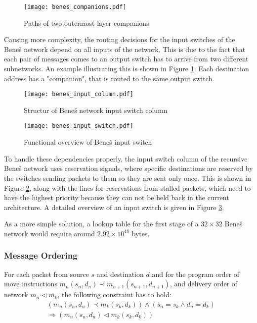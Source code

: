 \begin{figure}[!ht]
	\centering
	\texttt{[image: benes\_companions.pdf]}
	\caption{Paths of two outermost-layer companions}
	\label{fig:benes_companions}
\end{figure}

Causing more complexity, the routing decisions for the input switches of the Beneš network depend on all inputs of the network.
This is due to the fact that each pair of messages comes to an output switch has to arrive from two different subnetworks.
An example illustrating this is shown in Figure \ref{fig:benes_companions}.
Each destination address has a "companion", that is routed to the same output switch.

\begin{figure}[!ht]
	\centering
	\texttt{[image: benes\_input\_column.pdf]}
	\caption{Structur of Beneš network input switch column}
	\label{fig:benes_switchcolumn_in}
\end{figure}

\begin{figure}[!ht]
	\centering
	\texttt{[image: benes\_input\_switch.pdf]}
	\caption{Functional overview of Beneš input switch}
	\label{fig:benes_switch_in}
\end{figure}

To handle these dependencies properly, the input switch column of the recursive Beneš network uses reservation signals, where specific destinations are reserved by the switches sending packets to them so they are sent only once.
This is shown in Figure \ref{fig:benes_switchcolumn_in}, along with the lines for reservations from stalled packets, which need to have the highest priority because they can not be held back in the current architecture.
A detailed overview of an input switch is given in Figure \ref{fig:benes_switch_in}.

As a more simple solution, a lookup table for the first stage of a $32\times32$ Beneš network would require around $2.92\times10^{48}$ bytes.


\FloatBarrier
\subsubsection{Message Ordering}

		For each packet from source $s$ and destination $d$ and for the program order of move instructions $m_n(s_n, d_n) \prec m_{n+1}(s_{n+1}, d_{n+1})$, and delivery order of network $m_n \lhd m_k$, the following constraint has to hold:
	\begin{align*}
		& (m_n(s_n, d_n) \prec m_k(s_k, d_k)) \wedge (s_n = s_k \wedge d_n = d_k) \\
		& \Rightarrow (m_n(s_n, d_n) \lhd m_k(s_k, d_k))
	\end{align*}

